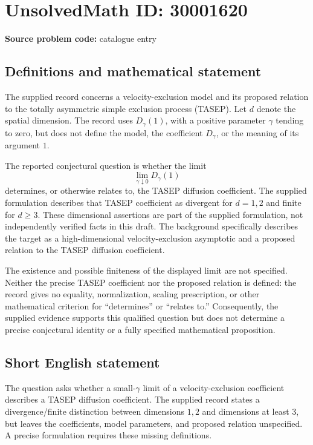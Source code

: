 \documentclass[11pt]{article}
\begin{document}
\section*{UnsolvedMath ID: 30001620}
\textbf{Source problem code:} catalogue entry
\subsection{Definitions and mathematical statement}
The supplied record concerns a velocity-exclusion model and its proposed relation to the totally asymmetric simple exclusion process (TASEP). Let \(d\) denote the spatial dimension. The record uses \(D_\gamma(1)\), with a positive parameter \(\gamma\) tending to zero, but does not define the model, the coefficient \(D_\gamma\), or the meaning of its argument \(1\).

The reported conjectural question is whether the limit
\[
\lim_{\gamma\downarrow 0}D_\gamma(1)
\]
determines, or otherwise relates to, the TASEP diffusion coefficient. The supplied formulation describes that TASEP coefficient as divergent for \(d=1,2\) and finite for \(d\geq 3\). These dimensional assertions are part of the supplied formulation, not independently verified facts in this draft. The background specifically describes the target as a high-dimensional velocity-exclusion asymptotic and a proposed relation to the TASEP diffusion coefficient.

The existence and possible finiteness of the displayed limit are not specified. Neither the precise TASEP coefficient nor the proposed relation is defined: the record gives no equality, normalization, scaling prescription, or other mathematical criterion for ``determines'' or ``relates to.'' Consequently, the supplied evidence supports this qualified question but does not determine a precise conjectural identity or a fully specified mathematical proposition.
\subsection{Short English statement}
The question asks whether a small-\(\gamma\) limit of a velocity-exclusion coefficient describes a TASEP diffusion coefficient. The supplied record states a divergence/finite distinction between dimensions \(1,2\) and dimensions at least \(3\), but leaves the coefficients, model parameters, and proposed relation unspecified. A precise formulation requires these missing definitions.
\end{document}
